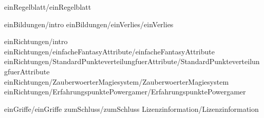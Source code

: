 
 {einRegelblatt/einRegelblatt}

 {einBildungen/intro}
 {einBildungen/einVerlies/einVerlies}

 {einRichtungen/intro}
 {einRichtungen/einfacheFantasyAttribute/einfacheFantasyAttribute}
 {einRichtungen/StandardPunkteverteilungfuerAttribute/StandardPunkteverteilungfuerAttribute}
 {einRichtungen/ZauberwoerterMagiesystem/ZauberwoerterMagiesystem}
 {einRichtungen/ErfahrungspunktePowergamer/ErfahrungspunktePowergamer}

 {einGriffe/einGriffe}
 {zumSchluss/zumSchluss}
 {Lizenzinformation/Lizenzinformation}


